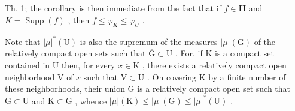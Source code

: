 Th. 1; the corollary is then immediate from the fact that if \(f \in \mathbf{H}\) and \(K = \operatorname{Supp}(f)\) , then \(f \leqslant \varphi_{K} \leqslant \varphi_{U}\) .

Note that \(|\mu|^*(\mathrm{U})\) is also the supremum of the measures \(|\mu|(\mathrm{G})\) of the relatively compact open sets such that \(\overline{\mathrm{G}} \subset \mathrm{U}\) . For, if \(\mathrm{K}\) is a compact set contained in \(\mathrm{U}\) then, for every \(x \in \mathrm{K}\) , there exists a relatively compact open neighborhood \(\mathrm{V}\) of \(x\) such that \(\overline{\mathrm{V}} \subset \mathrm{U}\) . On covering \(\mathrm{K}\) by a finite number of these neighborhoods, their union \(\mathrm{G}\) is a relatively compact open set such that \(\overline{\mathrm{G}} \subset \mathrm{U}\) and \(\mathrm{K} \subset \mathrm{G}\) , whence \(|\mu|(\mathrm{K}) \leqslant |\mu|(\mathrm{G}) \leqslant |\mu|^*(\mathrm{U})\) .

